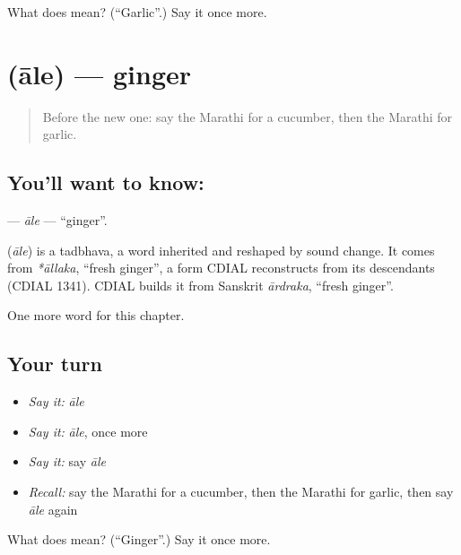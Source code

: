 \begin{tcolorbox}[breakable,colback=teal!4,colframe=teal!35!black,title={Before you move on}]
What does  mean? (\textquotedblleft{}Garlic\textquotedblright{}.) Say it once more.
\end{tcolorbox}
\section[\texorpdfstring{\mr{आले} (āle)}{आले (āle)}]{ (āle) — ginger}

\label{lesson:MR-C137-ale}



\begin{quote}
Before the new one: say the Marathi for a cucumber, then the Marathi for garlic.
\end{quote}

\subsection*{You'll want to know: }
\textbf{} — \emph{āle} — \textquotedblleft{}ginger\textquotedblright{}.

\begin{cousinweb}
\textbf{} (\emph{āle}) is a tadbhava, a word inherited and reshaped by sound change. It comes from \emph{*āllaka}, \textquotedblleft{}fresh ginger\textquotedblright{}, a form CDIAL reconstructs from its descendants (CDIAL 1341). CDIAL builds it from Sanskrit \emph{ārdraka}, \textquotedblleft{}fresh ginger\textquotedblright{}.
\end{cousinweb}

\begin{grammarlens}[title={What you've built}]
One more word for this chapter.
\end{grammarlens}

\subsection*{Your turn}
\begin{itemize}
\raggedright
  \item \emph{Say it:} \emph{āle}
  \item \emph{Say it:} \emph{āle}, once more
  \item \emph{Say it:} say \emph{āle}
  \item \emph{Recall:} say the Marathi for a cucumber, then the Marathi for garlic, then say \emph{āle} again
\end{itemize}

\begin{tcolorbox}[breakable,colback=teal!4,colframe=teal!35!black,title={Before you move on}]
What does  mean? (\textquotedblleft{}Ginger\textquotedblright{}.) Say it once more.
\end{tcolorbox}

